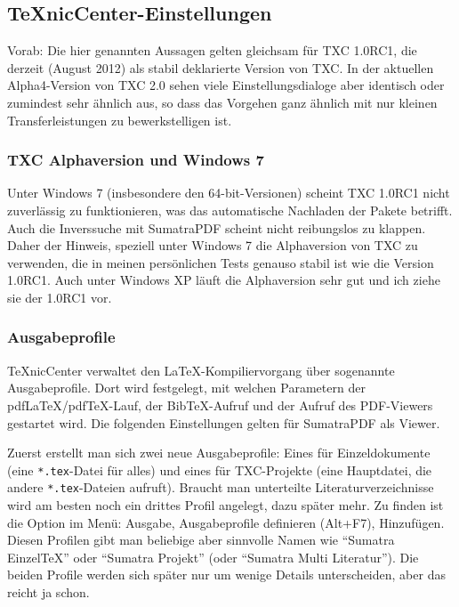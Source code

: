 \subsection{TeXnicCenter-Einstellungen}
Vorab: Die hier genannten Aussagen gelten gleichsam für TXC 1{.}0RC1, die derzeit (August 2012) als stabil deklarierte Version von TXC. In der aktuellen Alpha4-Version von TXC 2{.}0 sehen viele Einstellungsdialoge aber identisch oder zumindest sehr ähnlich aus, so dass das Vorgehen ganz ähnlich mit nur kleinen Transferleistungen zu bewerkstelligen ist.

\subsubsection{TXC Alphaversion und Windows 7}
Unter Windows 7 (insbesondere den 64-bit-Versionen) scheint TXC 1{.}0RC1 nicht zuverlässig zu funktionieren, was das automatische Nachladen der Pakete betrifft. Auch die Inverssuche mit SumatraPDF scheint nicht reibungslos zu klappen. Daher der Hinweis, speziell unter Windows 7 die Alphaversion von TXC zu verwenden, die in meinen persönlichen Tests genauso stabil ist wie die Version 1{.}0RC1. Auch unter Windows XP läuft die Alphaversion sehr gut und ich ziehe sie der 1{.}0RC1 vor.

\subsubsection{Ausgabeprofile}
TeXnicCenter verwaltet den \LaTeX-Kompiliervorgang über sogenannte Ausgabeprofile. Dort wird festgelegt, mit welchen Parametern der pdf\LaTeX/pdf\TeX-Lauf, der Bib\TeX-Aufruf und der Aufruf des PDF-Viewers gestartet wird. Die folgenden Einstellungen gelten für SumatraPDF als Viewer.

Zuerst erstellt man sich zwei neue Ausgabeprofile: Eines für Einzeldokumente (eine \texttt{*.tex}-Datei für alles) und eines für TXC-Projekte (eine Hauptdatei, die andere \texttt{*.tex}-Dateien aufruft). Braucht man unterteilte Literaturverzeichnisse wird am besten noch ein drittes Profil angelegt, dazu später mehr.
Zu finden ist die Option im Menü: Ausgabe, Ausgabeprofile definieren (Alt+F7), Hinzufügen. Diesen Profilen gibt man beliebige aber sinnvolle Namen wie \zb \enquote{Sumatra EinzelTeX} oder \enquote{Sumatra Projekt} (oder \enquote{Sumatra Multi Literatur}). Die beiden Profile werden sich später nur um wenige Details unterscheiden, aber das reicht ja schon.

